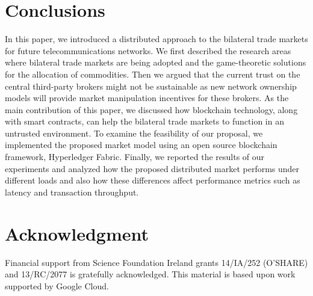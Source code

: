\documentclass[conference]{IEEEtran}
\begin{document}
\section{Conclusions}
In this paper, we introduced a distributed approach to the bilateral trade markets for future telecommunications networks. We first described the research areas where bilateral trade markets are being adopted and the game-theoretic solutions for the allocation of commodities. Then we argued that the current trust on the central third-party brokers might not be sustainable as new network ownership models will provide market manipulation incentives for these brokers. As the main contribution of this paper, we discussed how blockchain technology, along with smart contracts, can help the bilateral trade markets to function in an untrusted environment. To examine the feasibility of our proposal, we implemented the proposed market model using an open source blockchain framework, Hyperledger Fabric. Finally, we reported the results of our experiments and analyzed how the proposed distributed market performs under different loads and also how these differences affect performance metrics such as latency and transaction throughput.
\section*{Acknowledgment}

Financial support from Science Foundation Ireland grants 14/IA/252 (O'SHARE) and 13/RC/2077 is gratefully acknowledged. This material is based upon work supported by Google Cloud.



\end{document}
